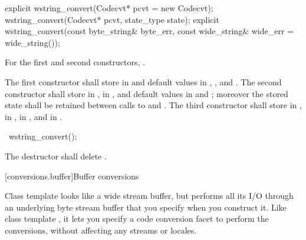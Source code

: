 %
\begin{itemdecl}
explicit wstring_convert(Codecvt* pcvt = new Codecvt);
wstring_convert(Codecvt* pcvt, state_type state);
explicit wstring_convert(const byte_string& byte_err,
    const wide_string& wide_err = wide_string());
\end{itemdecl}

\begin{itemdescr}
\pnum
\requires
For the first and second constructors, .

\pnum
\effects
The first constructor shall store  in  and
default values in , , and
.
The second constructor shall store  in ,
 in , and default values in
 and ; moreover the
stored state shall be retained between calls to  and
.
The third constructor shall store  in ,
 in , 
in , and  in
.
\end{itemdescr}

%
\begin{itemdecl}
~wstring_convert();
\end{itemdecl}

\begin{itemdescr}
\pnum
\effects The destructor shall delete .
\end{itemdescr}

[conversions.buffer]{Buffer conversions}

\pnum
Class template  looks like a wide stream buffer, but
performs all its I/O through an underlying byte stream buffer that you
specify when you construct it. Like class template , it
lets you specify a code conversion facet to perform the conversions,
without affecting any streams or locales.

\pnum
{}

